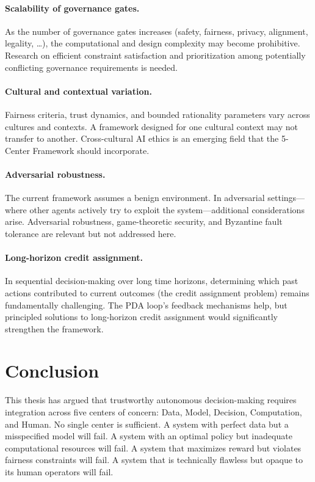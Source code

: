 \documentclass[11pt,a4paper]{article}
\begin{document}
\paragraph{Scalability of governance gates.} As the number of governance gates increases (safety, fairness, privacy, alignment, legality, \ldots), the computational and design complexity may become prohibitive. Research on efficient constraint satisfaction and prioritization among potentially conflicting governance requirements is needed.

\paragraph{Cultural and contextual variation.} Fairness criteria, trust dynamics, and bounded rationality parameters vary across cultures and contexts. A framework designed for one cultural context may not transfer to another. Cross-cultural AI ethics is an emerging field that the 5-Center Framework should incorporate.

\paragraph{Adversarial robustness.} The current framework assumes a benign environment. In adversarial settings---where other agents actively try to exploit the system---additional considerations arise. Adversarial robustness, game-theoretic security, and Byzantine fault tolerance are relevant but not addressed here.

\paragraph{Long-horizon credit assignment.} In sequential decision-making over long time horizons, determining which past actions contributed to current outcomes (the credit assignment problem) remains fundamentally challenging. The PDA loop's feedback mechanisms help, but principled solutions to long-horizon credit assignment would significantly strengthen the framework.

\section{Conclusion}
\label{sec:conclusion}

This thesis has argued that trustworthy autonomous decision-making requires integration across five centers of concern: Data, Model, Decision, Computation, and Human. No single center is sufficient. A system with perfect data but a misspecified model will fail. A system with an optimal policy but inadequate computational resources will fail. A system that maximizes reward but violates fairness constraints will fail. A system that is technically flawless but opaque to its human operators will fail.
\end{document}
